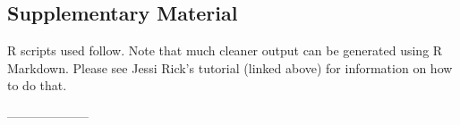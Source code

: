 \documentclass[letterpaper, 12pt]{article}
\begin{document}



\pagebreak
\subsection*{Supplementary Material}
\setcounter{table}{0} \renewcommand{\thetable}{S\arabic{table}}
\setcounter{figure}{0} \renewcommand{\thefigure}{S\arabic{figure}}

R scripts used follow. Note that much cleaner output can be generated using R Markdown. Please see Jessi Rick's tutorial (linked above) for information on how to do that. 

--------------------

\end{document}
